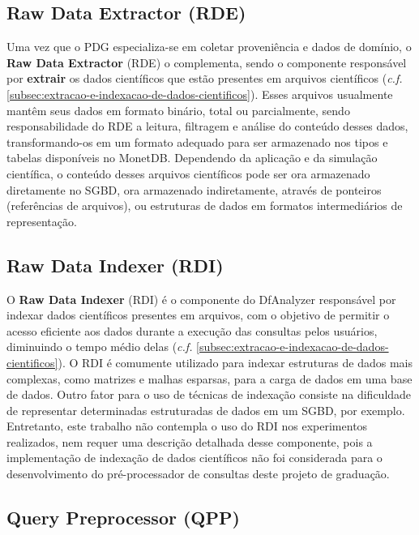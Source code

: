 \subsection{Raw Data Extractor (RDE)}

Uma vez que o PDG especializa-se em coletar proveniência e dados de domínio, o \textbf{Raw Data Extractor} (RDE) o complementa, sendo o componente responsável por \textbf{extrair} os dados científicos que estão presentes em arquivos científicos (\textit{c.f.} \autoref{subsec:extracao-e-indexacao-de-dados-cientificos}). Esses arquivos usualmente mantêm seus dados em formato binário, total ou parcialmente, sendo responsabilidade do RDE a leitura, filtragem e análise do conteúdo desses dados, transformando-os em um formato adequado para ser armazenado nos tipos e tabelas disponíveis no MonetDB. Dependendo da aplicação e da simulação científica, o conteúdo desses arquivos científicos pode ser ora armazenado diretamente no SGBD, ora armazenado indiretamente, através de ponteiros (referências de arquivos), ou estruturas de dados em formatos intermediários de representação.

\subsection{Raw Data Indexer (RDI)}

O \textbf{Raw Data Indexer} (RDI) é o componente do DfAnalyzer responsável por indexar dados científicos presentes em arquivos, com o objetivo de permitir o acesso eficiente aos dados durante a execução das consultas pelos usuários, diminuindo o tempo médio delas (\textit{c.f.} \autoref{subsec:extracao-e-indexacao-de-dados-cientificos}). O RDI é comumente utilizado para indexar estruturas de dados mais complexas, como matrizes e malhas esparsas, para a carga de dados em uma base de dados. Outro fator para o uso de técnicas de indexação consiste na dificuldade de representar determinadas estruturadas de dados em um SGBD, por exemplo. Entretanto, este trabalho não contempla o uso do RDI nos experimentos realizados, nem requer uma descrição detalhada desse componente, pois a implementação de indexação de dados científicos não foi considerada para o desenvolvimento do pré-processador de consultas deste projeto de graduação.

\subsection{Query Preprocessor (QPP)}

